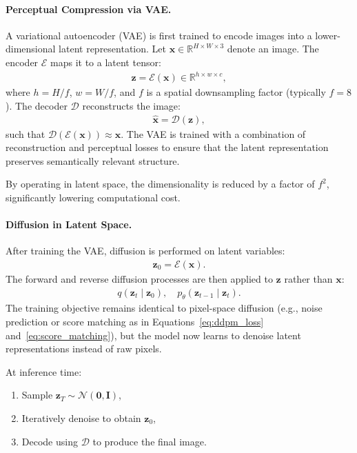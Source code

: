 \paragraph{Perceptual Compression via VAE.}
A variational autoencoder (VAE) is first trained to encode images into a lower-dimensional latent representation. Let $\mathbf{x} \in \mathbb{R}^{H \times W \times 3}$ denote an image. The encoder $\mathcal{E}$ maps it to a latent tensor:
\begin{align}
    \mathbf{z} = \mathcal{E}(\mathbf{x}) \in \mathbb{R}^{h \times w \times c},
    \label{eq:vae_encode}
\end{align}
where $h = H/f$, $w = W/f$, and $f$ is a spatial downsampling factor (typically $f=8$). The decoder $\mathcal{D}$ reconstructs the image:
\begin{align}
    \hat{\mathbf{x}} = \mathcal{D}(\mathbf{z}),
    \label{eq:vae_decode}
\end{align}
such that $\mathcal{D}(\mathcal{E}(\mathbf{x})) \approx \mathbf{x}$. The VAE is trained with a combination of reconstruction and perceptual losses to ensure that the latent representation preserves semantically relevant structure.

By operating in latent space, the dimensionality is reduced by a factor of $f^2$, significantly lowering computational cost.

\paragraph{Diffusion in Latent Space.}
After training the VAE, diffusion is performed on latent variables:
\begin{align}
    \mathbf{z}_0 = \mathcal{E}(\mathbf{x}).
    \label{eq:latent_init}
\end{align}
The forward and reverse diffusion processes are then applied to $\mathbf{z}$ rather than $\mathbf{x}$:
\begin{align}
    q(\mathbf{z}_t \mid \mathbf{z}_0), \quad p_\theta(\mathbf{z}_{t-1} \mid \mathbf{z}_t).
    \label{eq:latent_diffusion}
\end{align}
The training objective remains identical to pixel-space diffusion (e.g., noise prediction or score matching as in Equations~\eqref{eq:ddpm_loss} and~\eqref{eq:score_matching}), but the model now learns to denoise latent representations instead of raw pixels.

At inference time:
\begin{enumerate}
    \item Sample $\mathbf{z}_T \sim \mathcal{N}(\mathbf{0}, \mathbf{I})$,
    \item Iteratively denoise to obtain $\mathbf{z}_0$,
    \item Decode using $\mathcal{D}$ to produce the final image.
\end{enumerate}

